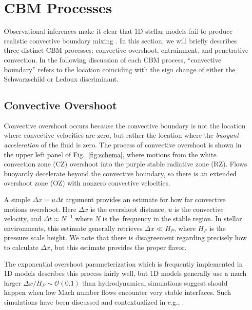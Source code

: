 \section{CBM Processes}
\label{sec:processes}

Observational inferences make it clear that 1D stellar models fail to produce realistic convective boundary mixing \citep[CBM,][]{pinsonneault_1997, claret_torres_2018, pedersen_etal_2021}.
In this section, we will briefly describes three distinct CBM processes: convective overshoot, entrainment, and penetrative convection.
In the following discussion of each CBM process, ``convective boundary'' refers to the location coinciding with the sign change of either the Schwarzschild or Ledoux discriminant.

\subsection{Convective Overshoot}
Convective overshoot occurs because the convective boundary is not the location where convective velocities are zero, but rather the location where the \emph{buoyant acceleration} of the fluid is zero.
The process of convective overshoot is shown in the upper left panel of Fig.~\ref{fig:schema}, where motions from the white convection zone (CZ) overshoot into the purple stable radiative zone (RZ).
Flows buoyantly decelerate beyond the convective boundary, so there is an extended overshoot zone (OZ) with nonzero convective velocities.

A simple $\Delta x = u \Delta t$ argument provides an estimate for how far convective motions overshoot.
Here $\Delta x$ is the overshoot distance, $u$ is the convective velocity, and $\Delta t \approx N^{-1}$ where $N$ is the \brunt$\,$frequency in the stable region.
In stellar environments, this estimate generally retrieves $\Delta x \ll H_P$, where $H_P$ is the pressure scale height.
We note that there is disagreement regarding precisely how to calculate $\Delta x$, but this estimate provides the proper flavor.

The exponential overshoot parameterization \citep[per e.g.,][]{herwig_2000} which is frequently implemented in 1D models describes this process fairly well, but 1D models generally use a much larger $\Delta x/H_P \sim \mathcal{O}(0.1)$ than hydrodynamical simulations suggest should happen when low Mach number flows encounter very stable interfaces.
Such simulations have been discussed and contextualized in e.g., \citet{korre_etal_2019}.

